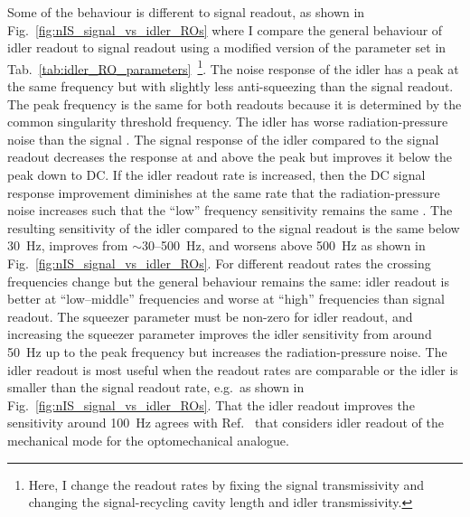 Some of the behaviour is different to signal readout, as shown in Fig.~\ref{fig:nIS_signal_vs_idler_ROs} where I compare the general behaviour of idler readout to signal readout using a modified version of the parameter set in Tab.~\ref{tab:idler_RO_parameters}~\footnote{Here, I change the readout rates by fixing the signal transmissivity and changing the signal-recycling cavity length and idler transmissivity.}. The noise response of the idler has a peak at the same frequency but with slightly less anti-squeezing  than the signal readout. The peak frequency is the same for both readouts because it is determined by the common singularity threshold frequency. The idler has worse radiation-pressure noise than the signal  . The signal response of the idler compared to the signal readout decreases the response at and above the peak but improves it below the peak down to DC. If the idler readout rate is increased, then the DC signal response improvement diminishes at the same rate that the radiation-pressure noise increases such that the ``low'' frequency sensitivity remains the same . 
The resulting sensitivity of the idler compared to the signal readout is the same below 30~Hz, improves from $\sim$30--500~Hz, and worsens above 500~Hz as shown in Fig.~\ref{fig:nIS_signal_vs_idler_ROs}. For different readout rates the crossing frequencies change but the general behaviour remains the same: idler readout is better at ``low--middle'' frequencies and worse at ``high'' frequencies than signal readout. The squeezer parameter must be non-zero for idler readout, and increasing the squeezer parameter improves the idler sensitivity from around 50~Hz up to the peak frequency but increases the radiation-pressure noise. The idler readout is most useful when the readout rates are comparable or the idler is smaller than the signal readout rate, e.g.\ as shown in Fig.~\ref{fig:nIS_signal_vs_idler_ROs}. 
That the idler readout improves the sensitivity around 100~Hz agrees with Ref.~\cite{liEnhancingInterferometerSensitivity2021} that considers idler readout of the mechanical mode for the optomechanical analogue.

